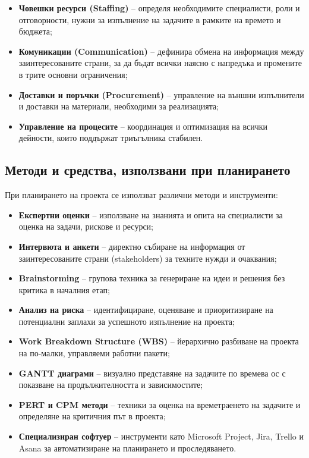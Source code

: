 \documentclass{scrartcl}
\begin{document}
\begin{FlushLeft}
\begin{itemize}
    \item \textbf{Човешки ресурси (Staffing)} – определя необходимите специалисти, роли и отговорности, нужни за изпълнение на задачите в рамките на времето и бюджета;
    \item \textbf{Комуникации (Communication)} – дефинира обмена на информация между заинтересованите страни, за да бъдат всички наясно с напредъка и промените в трите основни ограничения;
    \item \textbf{Доставки и поръчки (Procurement)} – управление на външни изпълнители и доставки на материали, необходими за реализацията;
    \item \textbf{Управление на процесите} – координация и оптимизация на всички дейности, които поддържат триъгълника стабилен.
\end{itemize}

\subsection{Методи и средства, използвани при планирането}

При планирането на проекта се използват различни методи и инструменти:

\begin{itemize}
    \item \textbf{Експертни оценки} – използване на знанията и опита на специалисти за оценка на задачи, рискове и ресурси;
    \item \textbf{Интервюта и анкети} – директно събиране на информация от заинтересованите страни (stakeholders) за техните нужди и очаквания;
    \item \textbf{Brainstorming} – групова техника за генериране на идеи и решения без критика в началния етап;
    \item \textbf{Анализ на риска} – идентифициране, оценяване и приоритизиране на потенциални заплахи за успешното изпълнение на проекта;
    \item \textbf{Work Breakdown Structure (WBS)} – йерархично разбиване на проекта на по-малки, управляеми работни пакети;
    \item \textbf{GANTT диаграми} – визуално представяне на задачите по времева ос с показване на продължителността и зависимостите;
    \item \textbf{PERT и CPM методи} – техники за оценка на времетраенето на задачите и определяне на критичния път в проекта;
    \item \textbf{Специализиран софтуер} – инструменти като Microsoft Project, Jira, Trello и Asana за автоматизиране на планирането и проследяването.
\end{itemize}


\end{FlushLeft}
\end{document}
